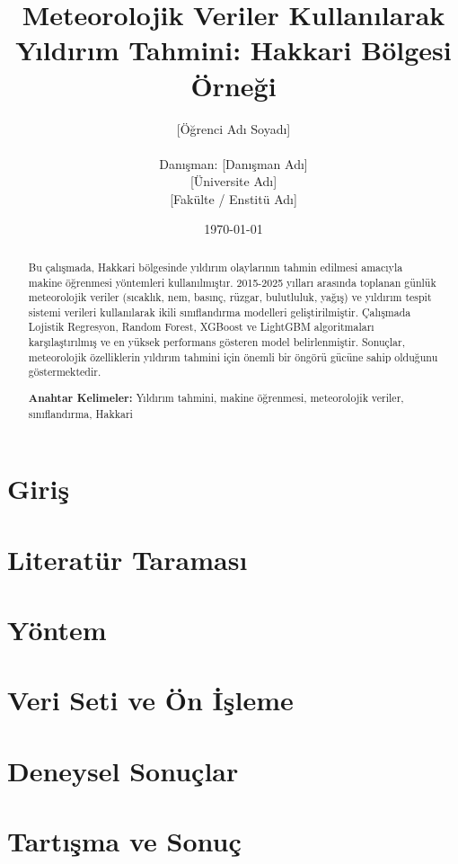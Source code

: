 \documentclass[12pt,a4paper]{report}
\title{
    \textbf{Meteorolojik Veriler Kullanılarak Yıldırım Tahmini: Hakkari Bölgesi Örneği}
}
\author{
    [Öğrenci Adı Soyadı] \\
    \\
    \small Danışman: [Danışman Adı] \\
    \small [Üniversite Adı] \\
    \small [Fakülte / Enstitü Adı]
}
\date{\today}
\begin{document}
\maketitle

\begin{abstract}
Bu çalışmada, Hakkari bölgesinde yıldırım olaylarının tahmin edilmesi amacıyla makine öğrenmesi yöntemleri kullanılmıştır. 2015-2025 yılları arasında toplanan günlük meteorolojik veriler (sıcaklık, nem, basınç, rüzgar, bulutluluk, yağış) ve yıldırım tespit sistemi verileri kullanılarak ikili sınıflandırma modelleri geliştirilmiştir. Çalışmada Lojistik Regresyon, Random Forest, XGBoost ve LightGBM algoritmaları karşılaştırılmış ve en yüksek performans gösteren model belirlenmiştir. Sonuçlar, meteorolojik özelliklerin yıldırım tahmini için önemli bir öngörü gücüne sahip olduğunu göstermektedir.

\textbf{Anahtar Kelimeler:} Yıldırım tahmini, makine öğrenmesi, meteorolojik veriler, sınıflandırma, Hakkari
\end{abstract}

\tableofcontents
\listoffigures
\listoftables

\chapter{Giriş}


\chapter{Literatür Taraması}


\chapter{Yöntem}


\chapter{Veri Seti ve Ön İşleme}


\chapter{Deneysel Sonuçlar}


\chapter{Tartışma ve Sonuç}



\end{document}
